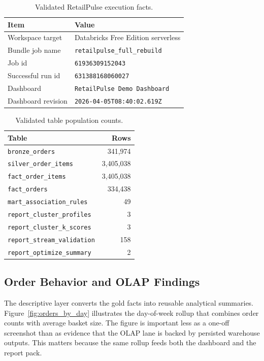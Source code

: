 \documentclass[journal]{IEEEtran}
\begin{document}
\begin{table}[!t]
\caption{Validated RetailPulse execution facts.}
\label{tab:run_facts}
\centering
\footnotesize
\begin{tabular}{p{2.9cm} p{4.7cm}}
\toprule
\textbf{Item} & \textbf{Value} \\
\midrule
Workspace target & Databricks Free Edition serverless \\
Bundle job name & \texttt{retailpulse\_full\_rebuild} \\
Job id & \texttt{61936309152043} \\
Successful run id & \texttt{631388168060027} \\
Dashboard & \texttt{RetailPulse Demo Dashboard} \\
Dashboard revision & \texttt{2026-04-05T08:40:02.619Z} \\
\bottomrule
\end{tabular}
\end{table}

\begin{table}[!t]
\caption{Validated table population counts.}
\label{tab:validated_counts}
\centering
\footnotesize
\begin{tabular}{p{4.8cm} r}
\toprule
\textbf{Table} & \textbf{Rows} \\
\midrule
\texttt{bronze\_orders} & 341,974 \\
\texttt{silver\_order\_items} & 3,405,038 \\
\texttt{fact\_order\_items} & 3,405,038 \\
\texttt{fact\_orders} & 334,438 \\
\texttt{mart\_association\_rules} & 49 \\
\texttt{report\_cluster\_profiles} & 3 \\
\texttt{report\_cluster\_k\_scores} & 3 \\
\texttt{report\_stream\_validation} & 158 \\
\texttt{report\_optimize\_summary} & 2 \\
\bottomrule
\end{tabular}
\end{table}

\subsection{Order Behavior and OLAP Findings}
The descriptive layer converts the gold facts into reusable analytical summaries. Figure~\ref{fig:orders_by_day} illustrates the day-of-week rollup that combines order counts with average basket size. The figure is important less as a one-off screenshot than as evidence that the OLAP lane is backed by persisted warehouse outputs. This matters because the same rollup feeds both the dashboard and the report pack.
\end{document}
